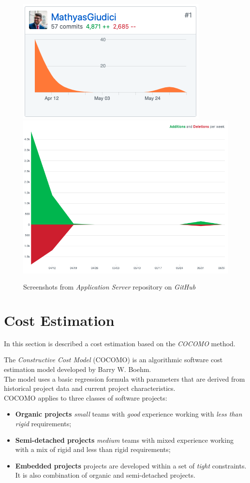 \begin{figure}[H]
\centering
\includegraphics[width=.45\textwidth]{./img/effort/server-stat1.png}
\includegraphics[width=.45\textwidth]{./img/effort/server-stat2.png}
\hspace{0.05\linewidth}
\caption{Screenshots from \textit{Application Server} repository on \textit{GitHub}}
\label{img:moqa-stats2}
\end{figure}

\section{Cost Estimation}
In this section is described a cost estimation based on the \textit{COCOMO} method.

The \textit{Constructive Cost Model} (COCOMO) is an algorithmic software cost estimation model developed by Barry W. Boehm.\\
The model uses a basic regression formula with parameters that are derived from historical project data and current project characteristics.\\

COCOMO applies to three classes of software projects:
\begin{itemize}
    \item \textbf{Organic projects} \textit{small} teams with \textit{good} experience working with \textit{less than rigid} requirements;
    \item \textbf{Semi-detached projects} \textit{medium} teams with mixed experience working with a mix of rigid and less than rigid requirements;
    \item \textbf{Embedded projects} projects are developed within a set of \textit{tight} constraints. It is also combination of organic and semi-detached projects.
\end{itemize}

